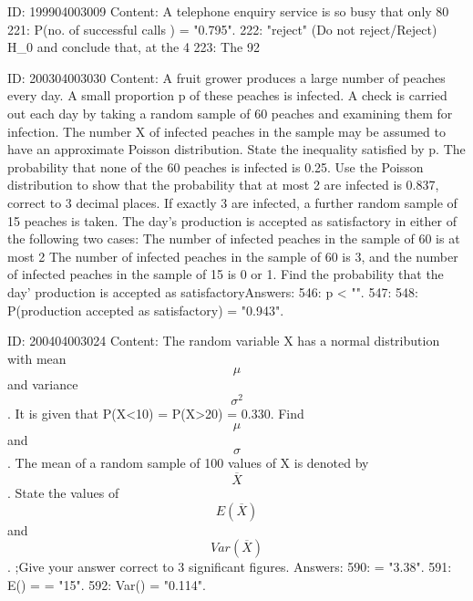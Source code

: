 \documentclass{article}
\begin{document}
ID: 199904003009
Content:
A telephone enquiry service is so busy that only 80%
221: P(no. of successful calls ) = "0.795".
222: "reject" (Do not reject/Reject) H_0 and conclude that, at the 4%
223: The 92%

ID: 200304003030
Content:
A fruit grower produces a large number of peaches every day. A small proportion p of these peaches is infected. A check is carried out each day by taking a random sample of 60 peaches and examining them for infection. The number X of infected peaches in the sample may be assumed to have an approximate Poisson distribution. State the inequality satisfied by p. The probability that none of the 60 peaches is infected is 0.25. Use the Poisson distribution to show that the probability that at most 2 are infected is 0.837, correct to 3 decimal places. If exactly 3 are infected, a further random sample of 15 peaches is taken. The day's production is accepted as satisfactory in either of the following two cases: The number of infected peaches in the sample of 60 is at most 2  The number of infected peaches in the sample of 60 is 3, and the number of infected peaches in the sample of 15 is 0 or 1. Find the probability that the day' production is accepted as satisfactoryAnswers:
546: p < "".
547: 
548: P(production accepted as satisfactory) = "0.943".

ID: 200404003024
Content:
The random variable X has a normal distribution with mean $$\mu$$  and variance $$\sigma^2$$. It is given that P(X<10) = P(X>20) = 0.330. Find $$\mu$$ and $$\sigma$$.  The mean of a random sample of 100 values of X is denoted by $$\overline{X}$$ . State the values of $$E(\overline{X})$$ and $$Var(\overline{X})$$. ;Give your answer correct to 3 significant figures. Answers:
590: \sigma = "3.38".
591: E() = \mu = "15".
592: Var() = "0.114".
\end{document}
